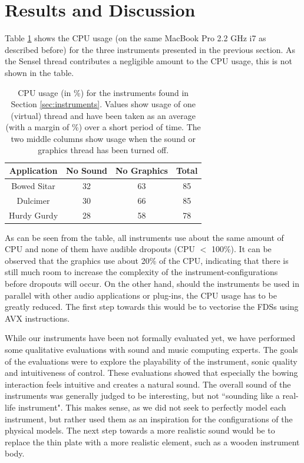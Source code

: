 \documentclass{article}
\begin{document}
\section{Results and Discussion}\label{sec:discussion}
Table \ref{tab:CPU} shows the CPU usage (on the same MacBook Pro 2.2 GHz i7 as described before) for the three instruments presented in the previous section. As the Sensel thread contributes a negligible amount to the CPU usage, this is not shown in the table.

\begin{table}[h]
\centering
\begin{tabular}{|c|c|c|c|}
\hline
Application & No Sound & No Graphics & Total \\
\hline
Bowed Sitar &32 &63 &85 \\
Dulcimer &30 &66 &85 \\
Hurdy Gurdy &28 &58 &78 \\
\hline
\end{tabular}\caption{CPU usage (in \%) for the instruments found in Section \ref{sec:instruments}. Values show usage of one (virtual) thread and have been taken as an average (with a margin of \%) over a short period of time. The two middle columns show usage when the sound or graphics thread has been turned off.}\label{tab:CPU}
\end{table}

\noindent As can be seen from the table, all instruments use about the same amount of CPU and none of them have audible dropouts (CPU $<$ 100\%). It can be observed that the graphics use about 20\% of the CPU, indicating that there is still much room to increase the complexity of the instrument-configurations before dropouts will occur. On the other hand, should the instruments be used in parallel with other audio applications or plug-ins, the CPU usage has to be greatly reduced. The first step towards this would be to vectorise the FDSs using AVX instructions.

While our instruments have been not formally evaluated yet, we have performed some qualitative evaluations with sound and music computing experts. The goals of the evaluations were to explore the playability of the instrument, sonic quality and intuitiveness of control. These evaluations showed that especially the bowing interaction feels intuitive and creates a natural sound. The overall sound of the instruments was generally judged to be interesting, but not ``sounding like a real-life instrument". This makes sense, as we did not seek to perfectly model each instrument, but rather used them as an inspiration for the configurations of the physical models. The next step towards a more realistic sound would be to replace the thin plate with a more realistic element, such as a wooden instrument body.
\end{document}
